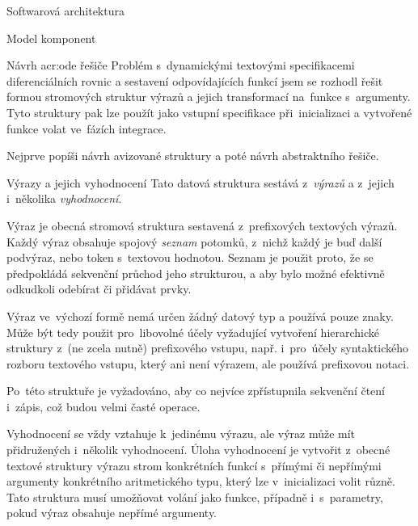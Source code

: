 \documentclass[thesis=M,czech]{FITthesis}[2012/06/26]
\newcommand{\acrlabel}[1]{acr:#1}
\newcommand{\acr}[1]{\acrshort{\acrlabel{#1}}}
\newcommand{\hl}[1]{\textit{#1}}
\newcommand{\name}[1]{\hl{#1}}
\begin{document}
\begin{section}{Softwarová architektura}
\begin{subsection}{Model komponent}

\end{subsection} %


\begin{subsection}{Návrh \acr{ode} řešiče}\label{ss:design:arch:ode}
Problém s~dynamickými textovými specifikacemi diferenciálních rovnic
a sestavení odpovídajících funkcí
jsem se rozhodl řešit formou stromových struktur výrazů
a jejich transformací na~funkce s~argumenty.
Tyto struktury pak lze použít jako vstupní specifikace při~inicializaci
a vytvořené funkce volat ve~fázích integrace.

Nejprve popíši návrh avizované struktury
a poté návrh abstraktního řešiče.


\begin{subsubsection}{Výrazy a jejich vyhodnocení}
\label{sss:design:arch:ode:exprs}
Tato datová struktura sestává
z~\name{výrazů} a z~jejich i~několika \hl{vyhodnocení}.


\begin{paragraph}{Výraz}\label{p:design:arch:ode:exprs:expr}
je obecná stromová struktura
sestavená z~prefixových textových výrazů.
Každý výraz obsahuje spojový \hl{seznam} potomků,
z~nichž každý je buď další podvýraz,
nebo token s~textovou hodnotou.
Seznam je použit proto,
že se předpokládá sekvenční průchod jeho strukturou,
a aby bylo možné efektivně odkudkoli odebírat či přidávat prvky.

Výraz ve~výchozí formě nemá určen žádný datový typ
a používá pouze znaky.
Může být tedy použit pro~libovolné účely
vyžadující vytvoření hierarchické struktury
z~(ne zcela nutně) prefixového vstupu,
např. i~pro~účely syntaktického rozboru
textového vstupu, který ani není výrazem,
ale používá prefixovou notaci.

Po~této struktuře je vyžadováno,
aby co nejvíce zpřístupnila sekvenční čtení i~zápis,
což budou velmi časté operace.
\end{paragraph} %


\begin{paragraph}{Vyhodnocení}\label{p:design:arch:ode:exprs:eval}
se vždy vztahuje k~jedinému výrazu,
ale výraz může mít přidružených i~několik vyhodnocení.
Úloha vyhodnocení je vytvořit z~obecné textové struktury
výrazu strom konkrétních funkcí s~přímými či nepřímými argumenty
konkrétního aritmetického typu,
který lze v~inicializaci volit různě.
Tato struktura musí umožňovat volání jako funkce,
případně i~s~parametry,
pokud výraz obsahuje nepřímé argumenty.


\end{paragraph}
\end{subsubsection}
\end{subsection}
\end{section}
\end{document}
